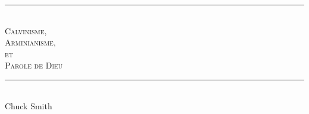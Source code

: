 
\newcommand{\HRule}{\rule{\linewidth}{0.2mm}}

\begin{titlepage}
\begin{center}
\mbox{}
\vfill
\HRule \\[0.4cm]
\textsc{ \Huge Calvinisme,\\[0.4cm] Arminianisme,\\[0.4cm] et\\[0.4cm] Parole de Dieu}\\[0.4cm]

\HRule \\[1.5cm]
{\LARGE Chuck Smith}\\[1.5cm]
\vfill
\mbox{}
\end{center}
\end{titlepage}

